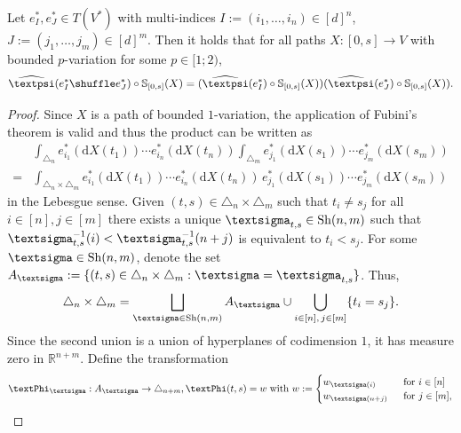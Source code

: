 \documentclass[openany]{book}
\begin{document}
\begin{theorem}\label{shuffle-property}
    Let $e^\ast_I, e^\ast_J\in T(V^\ast)$ with multi-indices $I:=(i_1,\dots, i_n)\in [d]^n$, $J:=(j_1,\dots,j_m)\in [d]^m$. Then it holds that for all paths $X:[0,s]\to V$ with bounded $p$-variation for some $p\in [1;2)$,
    \begin{equation*}
        \widehat{\gpsi}(e^\ast_I\shuffle e^\ast_J)\circ \mathbb S_{[0,s]}(X)= (\widehat{\gpsi}(e^\ast_I)\circ \mathbb S_{[0,s]}(X))(\widehat{\gpsi}(e^\ast_J)\circ \mathbb S_{[0,s]}(X)).
    \end{equation*}
    \begin{proof}
    Since $X$ is a path of bounded $1$-variation, the application of Fubini's theorem is valid and thus the product can be written as
    \begin{equation*}
        \begin{split}
            &\int_{\triangle_n} e_{i_1}^\ast(\mathrm dX(t_1))\cdots e_{i_n}^\ast(\mathrm dX(t_n)){\int}_{\triangle_{m}} e_{j_1}^\ast(\mathrm dX(s_1))\cdots e_{j_m}^\ast(\mathrm dX(s_m))\\=&\int_{\triangle_n\times \triangle_{m}} e_{i_1}^\ast(\mathrm dX(t_1))\cdots e_{i_n}^\ast(\mathrm dX(t_n))\, e_{j_1}^\ast(\mathrm dX(s_1))\cdots e_{j_m}^\ast(\mathrm dX(s_m))
        \end{split}
    \end{equation*}
    in the Lebesgue sense. Given $(t,s)\in \triangle_n\times \triangle_{m}$ such that $t_i\neq s_j$ for all $i\in [n],j\in [m]$ there exists a unique $\gsigma_{t,s} \in \mathrm{Sh}(n,m)$ such that $\gsigma_{t,s}^{-1}(i)<\gsigma_{t,s}^{-1}(n+j)$ is equivalent to $t_i<s_j$. For some $\gsigma\in \mathrm{Sh}(n,m)$, denote the set $A_{\gsigma}:=\{(t,s)\in \triangle_n\times \triangle_{m}: \gsigma=\gsigma_{t,s}\}$. Thus,
    \begin{equation*}
        \triangle_n\times \triangle_{m}=\bigsqcup_{\gsigma\in \mathrm{Sh}(n,m)} A_{\gsigma} \cup \bigcup_{\substack{i\in [n],\,j\in [m]}}\{t_i=s_j\}.
    \end{equation*}
    Since the second union is a union of hyperplanes of codimension $1$, it has measure zero in $\mathbb R^{n+m}$. Define the transformation 
    \begin{equation*}
        \gPhi_{\gsigma}:A_{\gsigma}\to \triangle_{n+m}, \gPhi(t,s)=w\;\textrm{with } w:=\begin{cases}
            w_{\gsigma(i)} \;&\textrm{ for } i\in [n]\\
            w_{\gsigma(n+j)}\;&\textrm{ for } j\in [m],

\end{cases}
\end{equation*}
\end{proof}
\end{theorem}
\end{document}
